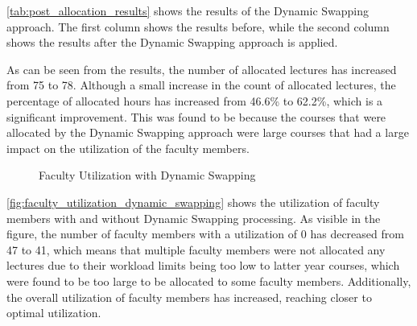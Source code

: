 \autoref{tab:post_allocation_results} shows the results of the Dynamic Swapping approach. The first column shows the results before, while the second column shows the results after the Dynamic Swapping approach is applied.

As can be seen from the results, the number of allocated lectures has increased from 75 to 78. Although a small increase in the count of allocated lectures, the percentage of allocated hours has increased from 46.6\% to 62.2\%, which is a significant improvement. This was found to be because the courses that were allocated by the Dynamic Swapping approach were large courses that had a large impact on the utilization of the faculty members.

\begin{figure}[H]
  \centering
  \caption{Faculty Utilization with Dynamic Swapping}
  \label{fig:faculty_utilization_dynamic_swapping}
\end{figure}

\autoref{fig:faculty_utilization_dynamic_swapping} shows the utilization of faculty members with and without Dynamic Swapping processing. As visible in the figure, the number of faculty members with a utilization of 0 has decreased from 47 to 41, which means that multiple faculty members were not allocated any lectures due to their workload limits being too low to latter year courses, which were found to be too large to be allocated to some faculty members. Additionally, the overall utilization of faculty members has increased, reaching closer to optimal utilization.


